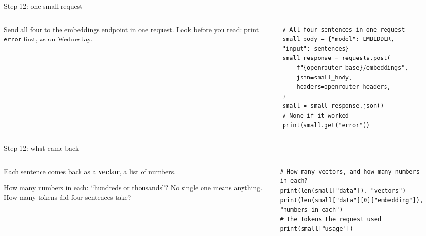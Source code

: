 \documentclass[9pt,aspectratio=169]{beamer}
\begin{document}
\begin{frame}[fragile]{Step 12: one small request}
    \begin{columns}[T]
        \begin{column}{0.37\textwidth}
            Send all four to the embeddings endpoint in one request. Look before you read: print \texttt{error} first, as on Wednesday.
        \end{column}
        \begin{column}{0.6\textwidth}
\begin{lstlisting}
# All four sentences in one request
small_body = {"model": EMBEDDER, "input": sentences}
small_response = requests.post(
    f"{openrouter_base}/embeddings",
    json=small_body,
    headers=openrouter_headers,
)
small = small_response.json()
# None if it worked
print(small.get("error"))
\end{lstlisting}
        \end{column}
    \end{columns}
\end{frame}

\begin{frame}[fragile]{Step 12: what came back}
    \begin{columns}[T]
        \begin{column}{0.37\textwidth}
            Each sentence comes back as a \textbf{vector}, a list of numbers.

            \medskip
            How many numbers in each: ``hundreds or thousands''? No single one means anything. How many tokens did four sentences take?
        \end{column}
        \begin{column}{0.6\textwidth}
\begin{lstlisting}
# How many vectors, and how many numbers in each?
print(len(small["data"]), "vectors")
print(len(small["data"][0]["embedding"]), "numbers in each")
# The tokens the request used
print(small["usage"])
\end{lstlisting}
        \end{column}
    \end{columns}
\end{frame}
\end{document}
